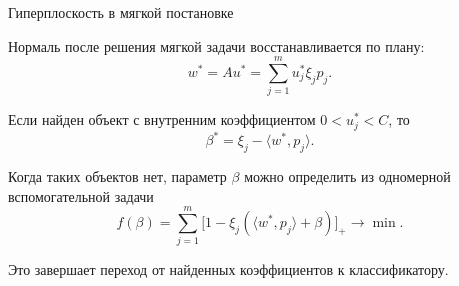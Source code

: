 \SPBGContentSlide
  {Гиперплоскость в мягкой постановке}
  {%
    \FormulaBody
    Нормаль после решения мягкой задачи восстанавливается по плану:
    \[
      w^*=Au^*=\sum_{j=1}^{m}u_j^*\xi_jp_j.
    \]

    Если найден объект с внутренним коэффициентом \(0<u_j^*<C\), то
    \[
      \beta^*=\xi_j-\langle w^*,p_j\rangle.
    \]

    Когда таких объектов нет, параметр \(\beta\) можно определить из
    одномерной вспомогательной задачи
    \[
      f(\beta)=
      \sum_{j=1}^{m}
      \bigl[1-\xi_j(\langle w^*,p_j\rangle+\beta)\bigr]_+
      \to\min.
    \]

    \Body
    Это завершает переход от найденных коэффициентов к классификатору.
  }


